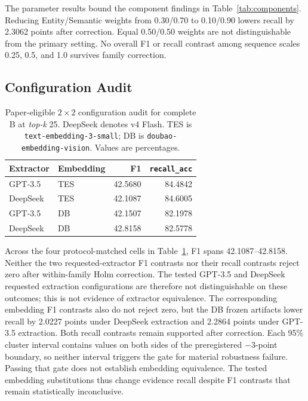 \documentclass[a4paper,twoside]{article}
\newcommand{\recallacc}{\texttt{recall\_acc}}
\newcommand{\topk}{\textit{top-k}}
\begin{document}
The parameter results bound the component findings in
Table~\ref{tab:components}. Reducing Entity/Semantic weights from 0.30/0.70 to
0.10/0.90 lowers recall by 2.3062 points after correction. Equal 0.50/0.50
weights are not distinguishable from the primary setting. No overall F1 or
recall contrast among sequence scales 0.25, 0.5, and 1.0 survives family
correction.

\subsection{Configuration Audit}

\begin{table}[t]
\centering
\caption{Paper-eligible $2\times2$ configuration audit for complete B at
\topk{} 25. DeepSeek denotes v4 Flash. TES is
\texttt{text-embedding-3-small}; DB is
\texttt{doubao-embedding-vision}. Values are percentages.}
\label{tab:model-robustness}
\small
\begin{tabularx}{\columnwidth}{@{}Xlrr@{}}
\toprule
Extractor & Embedding & F1 & \recallacc{} \\
\midrule
GPT-3.5 & TES & 42.5680 & 84.4842 \\
DeepSeek & TES & 42.1087 & 84.6005 \\
GPT-3.5 & DB & 42.1507 & 82.1978 \\
DeepSeek & DB & 42.8158 & 82.5778 \\
\bottomrule
\end{tabularx}
\end{table}

Across the four protocol-matched cells in
Table~\ref{tab:model-robustness}, F1 spans 42.1087--42.8158. Neither the two
requested-extractor F1 contrasts nor their recall contrasts reject zero after
within-family Holm correction. The tested GPT-3.5 and DeepSeek requested extraction
configurations are therefore not distinguishable on these outcomes; this
is not evidence of extractor equivalence. The corresponding embedding F1 contrasts also do not reject
zero, but the DB frozen artifacts lower recall by 2.0227 points under
DeepSeek extraction and
2.2864 points under GPT-3.5 extraction. Both recall contrasts remain supported
after correction. Each 95\% cluster interval contains values on both sides of
the preregistered $-3$-point boundary, so neither interval triggers the gate
for material robustness failure. Passing that gate does not establish
embedding equivalence. The tested embedding substitutions thus change evidence recall despite
F1 contrasts that remain statistically inconclusive.
\end{document}
